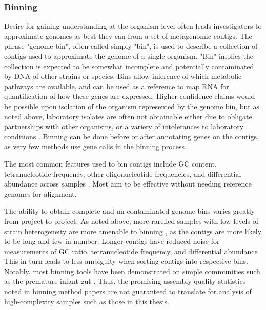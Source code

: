 \subsubsection{Binning}
Desire for gaining understanding at the organism level often leads investigators to approximate genomes as best they can from a set of metagenomic contigs.
The phrase "genome bin", often called simply "bin", is used to describe a collection of contigs used to approximate the genome of a single organism.
"Bin" implies the collection is expected to be somewhat incomplete and potentially contaminated by DNA of other strains or species.
Bins allow inference of which metabolic pathways are available, and can be used as a reference to map RNA for quantification of how these genes are expressed.
Higher confidence claims would be possible upon isolation of the organism represented by the genome bin, but as noted above, laboratory isolates are often not obtainable either due to obligate partnerships with other organisms, or a variety of intolerances to laboratory conditions \cite{stewart2012}.
Binning can be done before or after annotating genes on the contigs, as very few methods use gene calls in the binning process.

The most common features used to bin contigs include GC content, tetranucleotide frequency, other oligonucleotide frequencies, and differential abundance across samples \cite{sangwan2016}.
Most aim to be effective without needing reference genomes for alignment.

The ability to obtain complete and un-contaminated genome bins varies greatly from project to project.
As noted above, more rarefied samples with low levels of strain heterogeneity are more amenable to binning \cite{kunin2008, thomas2012}, as the contigs are more likely to be long and few in number.
Longer contigs have reduced noise for measurements of GC ratio, tetranucleotide frequency, and differential abundance \cite{sangwan2016}.
This in turn leads to less ambiguity when sorting contigs into respective bins.
Notably, most binning tools have been demonstrated on simple communities such as the premature infant gut \cite{sharon2013}.
Thus, the promising assembly quality statistics noted in binning method papers are not guaranteed to translate for analysis of high-complexity samples such as those in this thesis.

